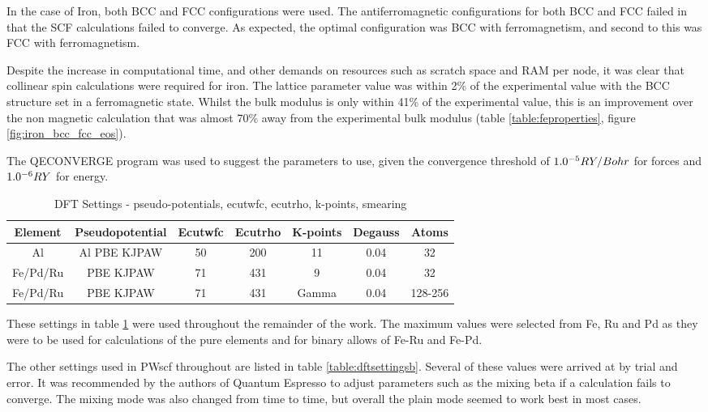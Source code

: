 In the case of Iron, both BCC and FCC configurations were used.  The antiferromagnetic configurations for both BCC and FCC failed in that the SCF calculations failed to converge.  As expected, the optimal configuration was BCC with ferromagnetism, and second to this was FCC with ferromagnetism.

Despite the increase in computational time, and other demands on resources such as scratch space and RAM per node, it was clear that collinear spin calculations were required for iron.  The lattice parameter value was within 2\% of the experimental value with the BCC structure set in a ferromagnetic state.  Whilst the bulk modulus is only within 41\% of the experimental value, this is an improvement over the non magnetic calculation that was almost 70\% away from the experimental bulk modulus (table \ref{table:feproperties}, figure \ref{fig:iron_bcc_fcc_eos}).


The QECONVERGE program was used to suggest the parameters to use, given the convergence threshold of $1.0 \time 10^{-5} RY/Bohr$ for forces and $1.0 \time 10^{-6} RY$ for energy.

\begin{table}[h]
\begin{center}
\renewcommand{\arraystretch}{1.2}
\begin{tabular}{c c c c c c c}
\hline\hline
Element & Pseudopotential & Ecutwfc & Ecutrho & K-points & Degauss & Atoms\\
\hline\hline
Al & Al PBE KJPAW & 50 & 200 & 11 & 0.04 & 32\\
Fe/Pd/Ru & PBE KJPAW & 71 & 431 & 9 & 0.04 & 32 \\ 
Fe/Pd/Ru & PBE KJPAW & 71 & 431 & Gamma & 0.04 & 128-256 \\ 
\hline\hline
\end{tabular}
\end{center}
\caption{DFT Settings - pseudo-potentials, ecutwfc, ecutrho, k-points, smearing}
\label{table:dftsettingsa}
\end{table}
\FloatBarrier

These settings in table \ref{table:dftsettingsa} were used throughout the remainder of the work.  The maximum values were selected from Fe, Ru and Pd as they were to be used for calculations of the pure elements and for binary allows of Fe-Ru and Fe-Pd.

The other settings used in PWscf throughout are listed in table \ref{table:dftsettingsb}.  Several of these values were arrived at by trial and error.  It was recommended by the authors of Quantum Espresso to adjust parameters such as the mixing beta if a calculation fails to converge.  The mixing mode was also changed from time to time, but overall the plain mode seemed to work best in most cases.

